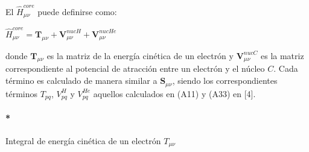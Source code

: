 \documentclass[
  letterpaper,
  DIV=11,
  numbers=noendperiod]{scrreprt}
\let\oldparagraph\paragraph
\renewcommand{\paragraph}[1]{\oldparagraph{#1}\mbox{}}
\begin{document}
El \(\hat{H}^{core}_{\mu \nu}\) puede definirse como:

\(\hat{H}^{core}_{\mu \nu} = \textbf{T}_{\mu \nu} + \textbf{V}^{nucH}_{\mu \nu} + \textbf{V}^{nucHe}_{\mu \nu}\)

donde \(\textbf{T}_{\mu \nu}\) es la matriz de la energía cinética de un
electrón y \(\textbf{V}^{nucC}_{\mu \nu}\) es la matriz correspondiente
al potencial de atracción entre un electrón y el núcleo \(C\). Cada
término es calculado de manera similar a \(\mathbf{S}_{\mu \nu}\),
siendo los correspondientes términos \(T_{pq}\), \(V^H_{pq}\) y
\(V^{He}_{pq}\) aquellos calculados en (A11) y (A33) en {[}4{]}.

\hypertarget{integral-de-energuxeda-cinuxe9tica-de-un-electruxf3n-t_mu-nu}{%
\paragraph*{\texorpdfstring{Integral de energía cinética de un electrón
\(T_{\mu \nu}\)}{Integral de energía cinética de un electrón T\_\{\textbackslash mu \textbackslash nu\}}}\label{integral-de-energuxeda-cinuxe9tica-de-un-electruxf3n-t_mu-nu}}
\end{document}

